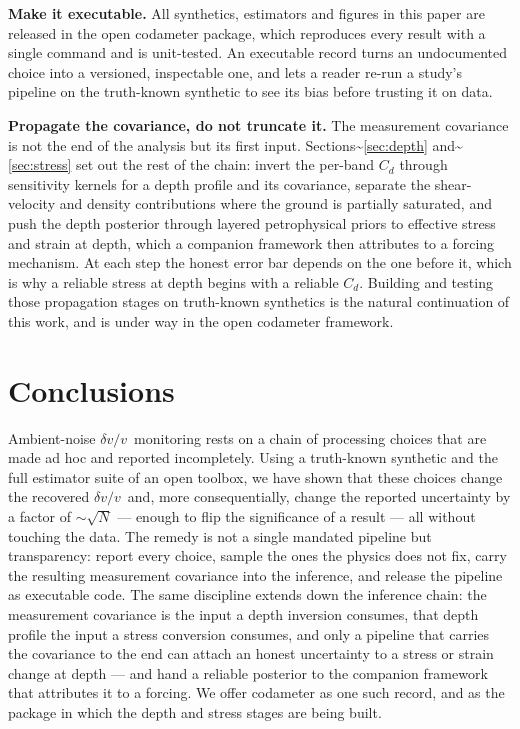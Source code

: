 \documentclass[
  referee]{gji}
\providecommand{\dvv}{\ensuremath{\delta v/v}}
\begin{document}
\textbf{Make it executable.} All synthetics, estimators and figures in
this paper are released in the open codameter package, which reproduces
every result with a single command and is unit-tested. An executable
record turns an undocumented choice into a versioned, inspectable one,
and lets a reader re-run a study's pipeline on the truth-known synthetic
to see its bias before trusting it on data.

\textbf{Propagate the covariance, do not truncate it.} The measurement
covariance is not the end of the analysis but its first input.
Sections\textasciitilde{}\ref{sec:depth}
and\textasciitilde{}\ref{sec:stress} set out the rest of the chain:
invert the per-band \(C_d\) through sensitivity kernels for a depth
profile and its covariance, separate the shear-velocity and density
contributions where the ground is partially saturated, and push the
depth posterior through layered petrophysical priors to effective stress
and strain at depth, which a companion framework then attributes to a
forcing mechanism. At each step the honest error bar depends on the one
before it, which is why a reliable stress at depth begins with a
reliable \(C_d\). Building and testing those propagation stages on
truth-known synthetics is the natural continuation of this work, and is
under way in the open codameter framework.

\section{Conclusions}\label{sec:conclusions}

Ambient-noise \dvv~monitoring rests on a chain of processing choices
that are made ad hoc and reported incompletely. Using a truth-known
synthetic and the full estimator suite of an open toolbox, we have shown
that these choices change the recovered \dvv~and, more consequentially,
change the reported uncertainty by a factor of \(\sim\!\sqrt{N}\) ---
enough to flip the significance of a result --- all without touching the
data. The remedy is not a single mandated pipeline but transparency:
report every choice, sample the ones the physics does not fix, carry the
resulting measurement covariance into the inference, and release the
pipeline as executable code. The same discipline extends down the
inference chain: the measurement covariance is the input a depth
inversion consumes, that depth profile the input a stress conversion
consumes, and only a pipeline that carries the covariance to the end can
attach an honest uncertainty to a stress or strain change at depth ---
and hand a reliable posterior to the companion framework that attributes
it to a forcing. We offer codameter as one such record, and as the
package in which the depth and stress stages are being built.
\end{document}
